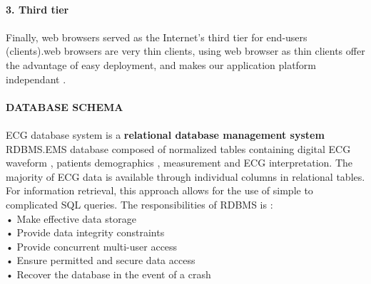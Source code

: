 \documentclass[12pt]{article}
\begin{document}
\paragraph{\textbf{3. Third tier}}
\paragraph{} Finally, web browsers served as the
Internet’s third tier for end-users (clients).web browsers are very thin clients, using web browser as thin clients offer the advantage of easy deployment, and makes our application platform independant .
\paragraph{\textbf{DATABASE SCHEMA }}
\paragraph{}ECG database system is a \textbf{relational database management system} RDBMS.EMS database composed of normalized tables containing digital ECG waveform , patients demographics , measurement and ECG interpretation. The majority of ECG data is available through individual columns in relational tables. For information retrieval, this approach allows for the use of simple to complicated SQL queries. The responsibilities of RDBMS is  : \\ • Make effective data storage\\ • Provide data integrity constraints\\ • Provide concurrent multi-user access\\ • Ensure permitted and secure data access\\ • Recover the database in the event of a crash
\end{document}
